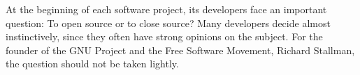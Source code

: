At the beginning of each software project, its developers face an important
question: To open source or to close source? Many developers decide almost
instinctively, since they often have strong opinions on the subject. For the
founder of the GNU Project and the Free Software Movement, Richard Stallman, the
question should not be taken lightly.
